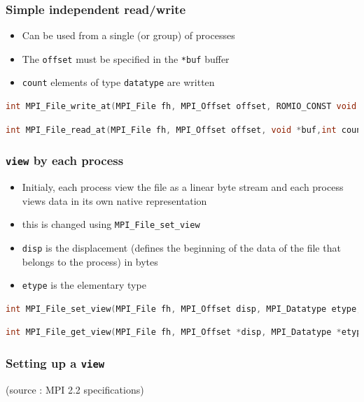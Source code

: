 \begin{frame}[containsverbatim]
\frametitle{Simple independent read/write}
\begin{itemize}
	\item {Can be used from a single (or group) of processes}
	\item {The \verb+offset+ must be specified in the \verb+*buf+ buffer}
	\item {\verb+count+ elements of type \verb+datatype+ are written}
\end{itemize}
\begin{lstlisting}[language=C,frame=lines]
int MPI_File_write_at(MPI_File fh, MPI_Offset offset, ROMIO_CONST void *buf, int count, MPI_Datatype datatype, MPI_Status *status)
\end{lstlisting}
\begin{lstlisting}[language=C,frame=lines]
int MPI_File_read_at(MPI_File fh, MPI_Offset offset, void *buf,int count, MPI_Datatype datatype, MPI_Status *status)
\end{lstlisting}
\end{frame}


\begin{frame}[containsverbatim]
\frametitle{\texttt{view} by each process}
\begin{itemize}
	\item {Initialy, each process view the file as a linear byte stream and each process views data in its own native representation}
	\item {this is changed using \verb+MPI_File_set_view+}
	\item {\verb+disp+ is the displacement (defines the beginning of the data of the file that belongs to the process) in bytes}
	\item {\verb+etype+ is the elementary type}
\end{itemize}
\begin{lstlisting}[language=C,frame=lines]
int MPI_File_set_view(MPI_File fh, MPI_Offset disp, MPI_Datatype etype, MPI_Datatype filetype, ROMIO_CONST char *datarep, MPI_Info info)
\end{lstlisting}
\begin{lstlisting}[language=C,frame=lines]
int MPI_File_get_view(MPI_File fh, MPI_Offset *disp, MPI_Datatype *etype, MPI_Datatype *filetype, char *datarep)
\end{lstlisting}
\end{frame}

\begin{frame}[containsverbatim]
\frametitle{Setting up a \texttt{view}}
\begin{center}

\end{center}
(source : MPI 2.2 specifications)
\end{frame}

